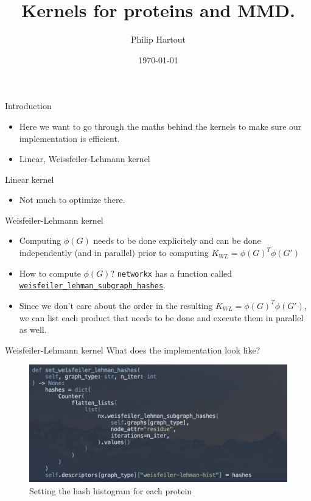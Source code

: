 \documentclass[aspectratio=169, 10pt, dvipsnames, handout]{beamer}
\title{Kernels for proteins and MMD.}
\date{\today}
\author{Philip Hartout}
\begin{document}
\maketitle

\begin{frame}[fragile]{Introduction}
  \begin{itemize}
  \item Here we want to go through the maths behind the kernels to make sure our
    implementation is efficient.
  \item Linear, Weissfeiler-Lehmann kernel
  \end{itemize}
\end{frame}

\begin{frame}[fragile]{Linear kernel}
  \begin{itemize}
  \item Not much to optimize there.
  \end{itemize}
\end{frame}


\begin{frame}[fragile]{Weisfeiler-Lehmann kernel}
  \begin{itemize}
  \item Computing $\phi(G)$ needs to be done explicitely and can be done
    independently (and in parallel) prior to computing $K_{WL}=\phi(G)^T\phi(G')$
  \item How to compute $\phi(G)$? \texttt{networkx} has a function called
    \href{https://networkx.org/documentation/stable/reference/algorithms/generated/networkx.algorithms.graph_hashing.weisfeiler_lehman_subgraph_hashes.html?highlight=weisfeiler_lehman_subgraph_hashes#networkx.algorithms.graph_hashing.weisfeiler_lehman_subgraph_hashes}{\texttt{weisfeiler\_lehman\_subgraph\_hashes}}.
  \item Since we don't care about the order in the resulting
    $K_{WL}=\phi(G)^T\phi(G')$, we can list each product that needs to be done
    and execute them in parallel as well.
  \end{itemize}
\end{frame}


\begin{frame}[fragile]{Weisfeiler-Lehmann kernel}
  What does the implementation look like?
  \begin{figure}
    \centering
    \includegraphics[width=.6\textwidth]{figures/setting_hash.png}
    \caption{Setting the hash histogram for each protein}
    \label{fig:hash_setting}
  \end{figure}
\end{frame}
\end{document}
